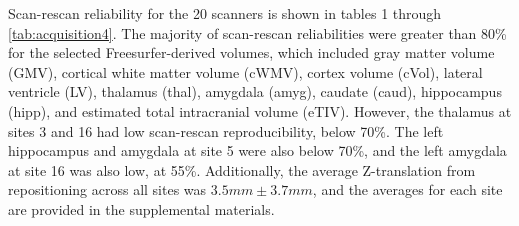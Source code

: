 Scan-rescan reliability for the 20 scanners is shown in tables 1 through \ref{tab:acquisition4}. The majority of scan-rescan reliabilities were greater than 80\% for the selected Freesurfer-derived volumes, which included gray matter volume (GMV), cortical white matter volume (cWMV), cortex volume (cVol), lateral ventricle (LV), thalamus (thal), amygdala (amyg), caudate (caud), hippocampus (hipp), and estimated total intracranial volume (eTIV). However, the thalamus at sites 3 and 16 had low scan-rescan reproducibility, below 70\%. The left hippocampus and amygdala at site 5 were also below 70\%, and the left amygdala at site 16 was also low, at 55\%. Additionally, the average Z-translation from repositioning across all sites was $3.5mm \pm 3.7mm$, and the averages for each site are provided in the supplemental materials.

